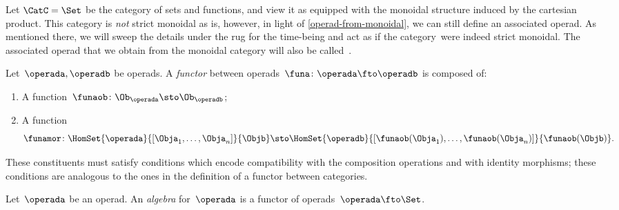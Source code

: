 \begin{example}
    Let $\CatC = \Set$ be the category of sets and functions, and view it as equipped with the monoidal structure induced by the cartesian product.
    This category is \emph{not} strict monoidal as is, however, in light of \cref{operad-from-monoidal}, we can still define an associated operad.
    As mentioned there, we will sweep the details under the rug for the time-being and act as if the category~\Set were indeed strict monoidal.
    The associated operad that we obtain from the monoidal category \Set will also be called~\Set.
\end{example}

\begin{ctdefinition}
    \label{def:functors_operads}
    Let~$\operada,\operadb$ be operads.
    A \emph{functor} between operads~$\funa\colon \operada \fto \operadb$  is composed of:
    \begin{enumerate}
        \item A function~$\funaob\colon \Ob_\operada\sto \Ob_\operadb$;
        \item A function
              \begin{equation}
                  \funamor\colon \HomSet{\operada}{[\Obja_1,\ldots,\Obja_n]}{\Objb}\sto \HomSet{\operadb}{[\funaob(\Obja_1),\ldots, \funaob(\Obja_n)]}{\funaob(\Objb)}.
              \end{equation}
    \end{enumerate}
    These constituents must satisfy conditions which encode compatibility with the composition operations and with identity morphisms; these conditions are analogous to the ones in the definition of a functor between categories.
\end{ctdefinition}


\begin{definition}
    \label{def:algebra_operad}
    Let~$\operada$ be an operad.
    An \emph{algebra} for~$\operada$ is a functor of operads~$\operada \fto \Set$.
\end{definition}



